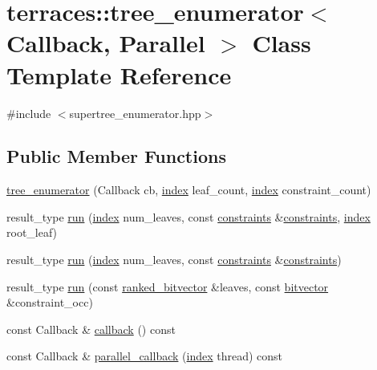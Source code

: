 \hypertarget{classterraces_1_1tree__enumerator}{}\section{terraces\+:\+:tree\+\_\+enumerator$<$ Callback, Parallel $>$ Class Template Reference}
\label{classterraces_1_1tree__enumerator}


{\ttfamily \#include $<$supertree\+\_\+enumerator.\+hpp$>$}

\subsection*{Public Member Functions}
\begin{DoxyCompactItemize}
\item 
\hyperlink{classterraces_1_1tree__enumerator_abac88ae38b6f65882007d15d4a4fc213}{tree\+\_\+enumerator} (Callback cb, \hyperlink{namespaceterraces_adbc33ccb543d1634e96d0eb02e472c77}{index} leaf\+\_\+count, \hyperlink{namespaceterraces_adbc33ccb543d1634e96d0eb02e472c77}{index} constraint\+\_\+count)
\item 
result\+\_\+type \hyperlink{classterraces_1_1tree__enumerator_ae523d14dfc46be4015d4ba5993f4c2ba}{run} (\hyperlink{namespaceterraces_adbc33ccb543d1634e96d0eb02e472c77}{index} num\+\_\+leaves, const \hyperlink{namespaceterraces_a6f603ffd30ed4d902fce6424492e0581}{constraints} \&\hyperlink{namespaceterraces_a6f603ffd30ed4d902fce6424492e0581}{constraints}, \hyperlink{namespaceterraces_adbc33ccb543d1634e96d0eb02e472c77}{index} root\+\_\+leaf)
\item 
result\+\_\+type \hyperlink{classterraces_1_1tree__enumerator_a933db3e1e37840e6a217bc1faca3194b}{run} (\hyperlink{namespaceterraces_adbc33ccb543d1634e96d0eb02e472c77}{index} num\+\_\+leaves, const \hyperlink{namespaceterraces_a6f603ffd30ed4d902fce6424492e0581}{constraints} \&\hyperlink{namespaceterraces_a6f603ffd30ed4d902fce6424492e0581}{constraints})
\item 
result\+\_\+type \hyperlink{classterraces_1_1tree__enumerator_a7d5262aee9bc2a40318b39314838dc92}{run} (const \hyperlink{namespaceterraces_acc45ec9c561024c50ecbce5b6738ba08}{ranked\+\_\+bitvector} \&leaves, const \hyperlink{namespaceterraces_a1b526fb554dff829f7ad51eb21d5ed06}{bitvector} \&constraint\+\_\+occ)
\item 
const Callback \& \hyperlink{classterraces_1_1tree__enumerator_a050104cc4faec501e8329c427730e372}{callback} () const
\item 
const Callback \& \hyperlink{classterraces_1_1tree__enumerator_a21af6b1b63002d05ce90f8100521d858}{parallel\+\_\+callback} (\hyperlink{namespaceterraces_adbc33ccb543d1634e96d0eb02e472c77}{index} thread) const
\end{DoxyCompactItemize}
